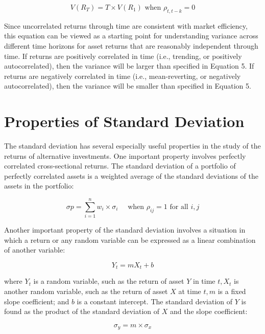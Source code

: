 \documentclass[11pt]{article}
\begin{document}
\begin{equation*}
V\left(R_{T}\right)=T \times V\left(R_{1}\right) \text { when } \rho_{t, t-k}=0 \tag{5}
\end{equation*}


Since uncorrelated returns through time are consistent with market efficiency, this equation can be viewed as a starting point for understanding variance across different time horizons for asset returns that are reasonably independent through time. If returns are positively correlated in time (i.e., trending, or positively\\
autocorrelated), then the variance will be larger than specified in Equation 5. If returns are negatively correlated in time (i.e., mean-reverting, or negatively autocorrelated), then the variance will be smaller than specified in Equation 5.

\section*{Properties of Standard Deviation}
The standard deviation has several especially useful properties in the study of the returns of alternative investments. One important property involves perfectly correlated cross-sectional returns. The standard deviation of a portfolio of perfectly correlated assets is a weighted average of the standard deviations of the assets in the portfolio:


\begin{equation*}
\sigma p=\sum_{i=1}^{n} w_{i} \times \sigma_{i} \quad \text { when } \rho_{i j}=1 \text { for all } i, j \tag{6}
\end{equation*}


Another important property of the standard deviation involves a situation in which a return or any random variable can be expressed as a linear combination of another variable:

$$
Y_{t}=m X_{t}+b
$$

where $Y_{t}$ is a random variable, such as the return of asset $Y$ in time $t, X_{t}$ is another random variable, such as the return of asset $X$ at time $t, m$ is a fixed slope coefficient; and $b$ is a constant intercept. The standard deviation of $Y$ is found as the product of the standard deviation of $X$ and the slope coefficient:


\begin{equation*}
\sigma_{y}=m \times \sigma_{x} \tag{7}
\end{equation*}
\end{document}
